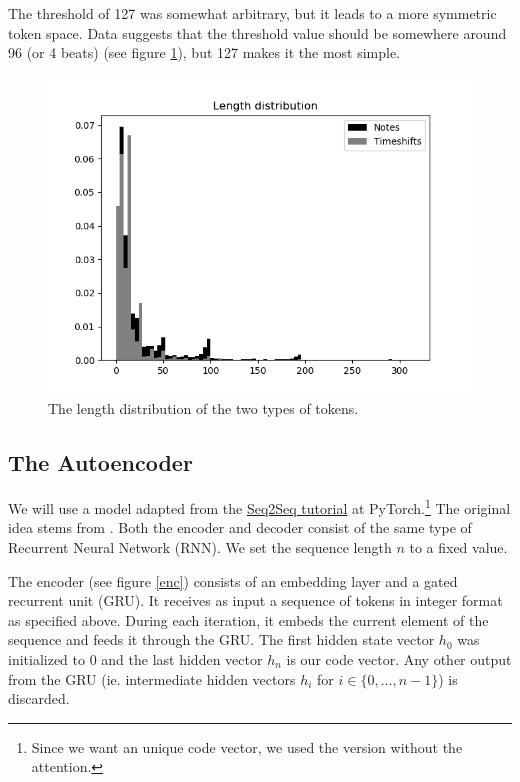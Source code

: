 \documentclass[a4paper]{article}
\begin{document}
The threshold of 127 was somewhat arbitrary, but it leads to a more symmetric token space. Data suggests that the threshold value should be somewhere around 96 (or 4 beats) (see figure \ref{tokens-hist}), but 127 makes it the most simple.

\begin{figure}[h!]
  \includegraphics[width=\textwidth]{tokens/length}
  \caption{The length distribution of the two types of tokens.}
  \label{tokens-hist}
\end{figure}

\subsection{The Autoencoder}

We will use a model adapted from the \href{https://pytorch.org/tutorials/intermediate/seq2seq_translation_tutorial.html}{Seq2Seq tutorial} at PyTorch.\footnote{Since we want an unique code vector, we used the version without the attention.} The original idea stems from \cite{sutskever2014sequence}. Both the encoder and decoder consist of the same type of Recurrent Neural Network (RNN). We set the sequence length $n$ to a fixed value.

The encoder (see figure \ref{enc}) consists of an embedding layer and a gated recurrent unit (GRU). It receives as input a sequence of tokens in integer format as specified above. During each iteration, it embeds the current element of the sequence and feeds it through the GRU. The first hidden state vector $h_0$ was initialized to 0 and the last hidden vector $h_n$ is our code vector. Any other output from the GRU (ie. intermediate hidden vectors $h_i$ for $i\in\{0,\ldots,n-1\}$) is discarded.
\end{document}
